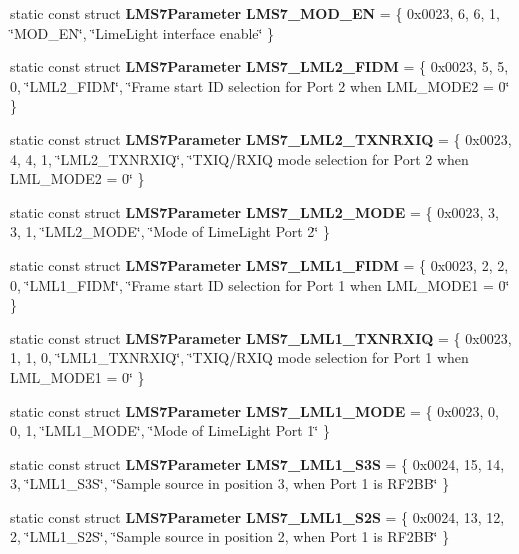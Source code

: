 \begin{DoxyCompactItemize}
\item 
static const struct {\bf L\+M\+S7\+Parameter} {\bf L\+M\+S7\+\_\+\+M\+O\+D\+\_\+\+EN} = \{ 0x0023, 6, 6, 1, \char`\"{}\+M\+O\+D\+\_\+\+E\+N\char`\"{}, \char`\"{}\+Lime\+Light interface enable\char`\"{} \}
\item 
static const struct {\bf L\+M\+S7\+Parameter} {\bf L\+M\+S7\+\_\+\+L\+M\+L2\+\_\+\+F\+I\+DM} = \{ 0x0023, 5, 5, 0, \char`\"{}\+L\+M\+L2\+\_\+\+F\+I\+D\+M\char`\"{}, \char`\"{}\+Frame start I\+D selection for Port 2 when L\+M\+L\+\_\+\+M\+O\+D\+E2 = 0\char`\"{} \}
\item 
static const struct {\bf L\+M\+S7\+Parameter} {\bf L\+M\+S7\+\_\+\+L\+M\+L2\+\_\+\+T\+X\+N\+R\+X\+IQ} = \{ 0x0023, 4, 4, 1, \char`\"{}\+L\+M\+L2\+\_\+\+T\+X\+N\+R\+X\+I\+Q\char`\"{}, \char`\"{}\+T\+X\+I\+Q/\+R\+X\+I\+Q mode selection for Port 2 when L\+M\+L\+\_\+\+M\+O\+D\+E2 = 0\char`\"{} \}
\item 
static const struct {\bf L\+M\+S7\+Parameter} {\bf L\+M\+S7\+\_\+\+L\+M\+L2\+\_\+\+M\+O\+DE} = \{ 0x0023, 3, 3, 1, \char`\"{}\+L\+M\+L2\+\_\+\+M\+O\+D\+E\char`\"{}, \char`\"{}\+Mode of Lime\+Light Port 2\char`\"{} \}
\item 
static const struct {\bf L\+M\+S7\+Parameter} {\bf L\+M\+S7\+\_\+\+L\+M\+L1\+\_\+\+F\+I\+DM} = \{ 0x0023, 2, 2, 0, \char`\"{}\+L\+M\+L1\+\_\+\+F\+I\+D\+M\char`\"{}, \char`\"{}\+Frame start I\+D selection for Port 1 when L\+M\+L\+\_\+\+M\+O\+D\+E1 = 0\char`\"{} \}
\item 
static const struct {\bf L\+M\+S7\+Parameter} {\bf L\+M\+S7\+\_\+\+L\+M\+L1\+\_\+\+T\+X\+N\+R\+X\+IQ} = \{ 0x0023, 1, 1, 0, \char`\"{}\+L\+M\+L1\+\_\+\+T\+X\+N\+R\+X\+I\+Q\char`\"{}, \char`\"{}\+T\+X\+I\+Q/\+R\+X\+I\+Q mode selection for Port 1 when L\+M\+L\+\_\+\+M\+O\+D\+E1 = 0\char`\"{} \}
\item 
static const struct {\bf L\+M\+S7\+Parameter} {\bf L\+M\+S7\+\_\+\+L\+M\+L1\+\_\+\+M\+O\+DE} = \{ 0x0023, 0, 0, 1, \char`\"{}\+L\+M\+L1\+\_\+\+M\+O\+D\+E\char`\"{}, \char`\"{}\+Mode of Lime\+Light Port 1\char`\"{} \}
\item 
static const struct {\bf L\+M\+S7\+Parameter} {\bf L\+M\+S7\+\_\+\+L\+M\+L1\+\_\+\+S3S} = \{ 0x0024, 15, 14, 3, \char`\"{}\+L\+M\+L1\+\_\+\+S3\+S\char`\"{}, \char`\"{}\+Sample source in position 3, when Port 1 is R\+F2\+B\+B\char`\"{} \}
\item 
static const struct {\bf L\+M\+S7\+Parameter} {\bf L\+M\+S7\+\_\+\+L\+M\+L1\+\_\+\+S2S} = \{ 0x0024, 13, 12, 2, \char`\"{}\+L\+M\+L1\+\_\+\+S2\+S\char`\"{}, \char`\"{}\+Sample source in position 2, when Port 1 is R\+F2\+B\+B\char`\"{} \}

\end{DoxyCompactItemize}
